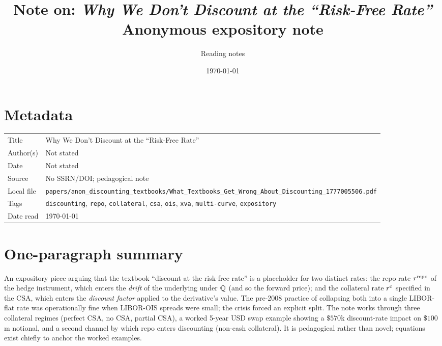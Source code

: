 \documentclass[11pt,a4paper]{article}
\title{Note on: \emph{Why We Don't Discount at the ``Risk-Free Rate''}\\
       \large Anonymous expository note}
\author{Reading notes}
\date{\today}
\begin{document}
\maketitle

\section*{Metadata}
\begin{tabular}{@{}p{3.5cm}p{11cm}@{}}
\toprule
Title           & Why We Don't Discount at the ``Risk-Free Rate'' \\
Author(s)       & Not stated \\
Date            & Not stated \\
Source          & No SSRN/DOI; pedagogical note \\
Local file      & \texttt{papers/anon\_discounting\_textbooks/What\_Textbooks\_Get\_Wrong\_About\_Discounting\_1777005506.pdf} \\
Tags            & \texttt{discounting}, \texttt{repo}, \texttt{collateral},
                  \texttt{csa}, \texttt{ois}, \texttt{xva}, \texttt{multi-curve}, \texttt{expository} \\
Date read       & \today \\
\bottomrule
\end{tabular}

\section*{One-paragraph summary}
An expository piece arguing that the textbook ``discount at the
risk-free rate'' is a placeholder for two distinct rates: the repo
rate $r^{\mathrm{repo}}$ of the hedge instrument, which enters the \emph{drift}
of the underlying under $\mathbb{Q}$ (and so the forward price); and the
collateral rate $r^{\mathrm{c}}$ specified in the CSA, which enters the
\emph{discount factor} applied to the derivative's value. The pre-2008
practice of collapsing both into a single LIBOR-flat rate was
operationally fine when LIBOR-OIS spreads were small; the crisis
forced an explicit split. The note works through three collateral
regimes (perfect CSA, no CSA, partial CSA), a worked 5-year USD swap
example showing a $\$570$k discount-rate impact on $\$100$m notional,
and a second channel by which repo enters discounting (non-cash
collateral). It is pedagogical rather than novel; equations exist
chiefly to anchor the worked examples.
\end{document}
